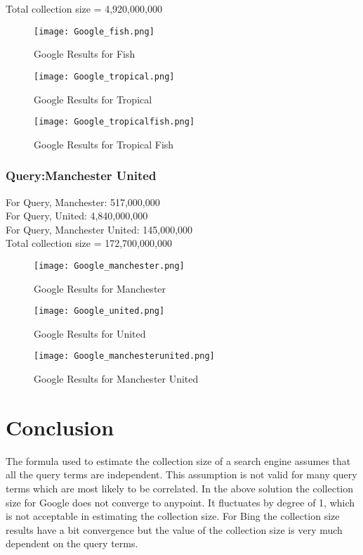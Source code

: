 \documentclass[12pt]{report}
\begin{document}
Total collection size = 4,920,000,000\\

\begin{figure}[ht] 
  \centering
  \texttt{[image: Google\_fish.png]}
  \caption{Google Results for Fish}
  \label{fig:19}
\end{figure}

\begin{figure}[ht] 
  \centering
  \texttt{[image: Google\_tropical.png]}
  \caption{Google Results for Tropical}
  \label{fig:20}
\end{figure}

\begin{figure}[ht] 
  \centering
  \texttt{[image: Google\_tropicalfish.png]}
  \caption{Google Results for Tropical Fish}
  \label{fig:21}
\end{figure}

\subsubsection{Query:Manchester United}
For Query, Manchester: 517,000,000\\
For Query, United: 4,840,000,000\\
For Query, Manchester United: 145,000,000\\

Total collection size = 172,700,000,000\\


\begin{figure}[ht] 
  \centering
  \texttt{[image: Google\_manchester.png]}
  \caption{Google Results for Manchester}
  \label{fig:22}
\end{figure}

\begin{figure}[ht] 
  \centering
  \texttt{[image: Google\_united.png]}
  \caption{Google Results for United}
  \label{fig:23}
\end{figure}

\begin{figure}[ht] 
  \centering
  \texttt{[image: Google\_manchesterunited.png]}
  \caption{Google Results for Manchester United}
  \label{fig:24}
\end{figure}

\section{Conclusion}
The formula used to estimate the collection size of a search engine assumes that all the query terms are independent. This assumption is not valid for many query terms which are most likely to be correlated. In the above solution the collection size for Google does not converge to anypoint. It fluctuates by degree of 1, which is not acceptable in estimating the collection size. For Bing the collection size results have a bit convergence but the value of the collection size is very much dependent on the query terms. 
\end{document}

